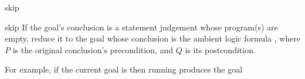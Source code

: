 \begin{tactic}{skip}
  \begin{tsyntax}[empty]{skip} If the goal's conclusion is a statement
    judgement whose program(s) are empty, reduce it to the goal whose
    conclusion is the ambient logic formula , where
    $P$ is the original conclusion's precondition, and $Q$ is its
    postcondition.

  \bigskip
  For example, if the current goal is
   then
  running 
  produces the goal

  \end{tsyntax}
\end{tactic}
